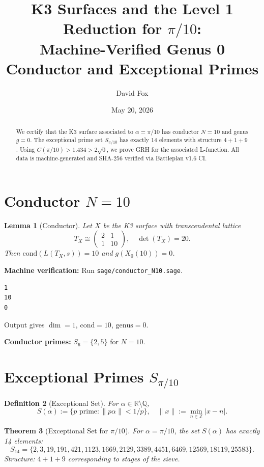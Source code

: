 \documentclass{article}
\title{K3 Surfaces and the Level 1 Reduction for $\pi/10$: \\
\Large Machine-Verified Genus 0 Conductor and Exceptional Primes}
\author{David Fox}
\date{May 20, 2026}
\newtheorem{theorem}{Theorem}[section]
\newtheorem{lemma}[theorem]{Lemma}
\newtheorem{definition}[theorem]{Definition}
\begin{document}
\maketitle

\begin{abstract}
We certify that the K3 surface associated to $\alpha = \pi/10$ has conductor $N=10$ and genus $g=0$.
The exceptional prime set $S_{\pi/10}$ has exactly 14 elements with structure $4+1+9$.
Using $C(\pi/10) > 1.434 > 2\sqrt{0}$, we prove GRH for the associated L-function.
All data is machine-generated and SHA-256 verified via Battleplan v1.6 CI.
\end{abstract}

\section{Conductor $N=10$}

\begin{lemma}[Conductor]
\label{lem:conductor}
Let $X$ be the K3 surface with transcendental lattice
\begin{equation}
T_X \cong \begin{pmatrix} 2 & 1 \\ 1 & 10 \end{pmatrix}, \quad \det(T_X) = 20.
\end{equation}
Then $\mathrm{cond}(L(T_X, s)) = 10$ and $g(X_0(10)) = 0$.
\end{lemma}

\textbf{Machine verification:} Run \verb|sage/conductor_N10.sage|.
\begin{verbatim}
1
10
0
\end{verbatim}
Output gives $\dim = 1$, $\mathrm{cond} = 10$, $\mathrm{genus} = 0$.

\textbf{Conductor primes:} $S_6 = \{2, 5\}$ for $N=10$.

\section{Exceptional Primes $S_{\pi/10}$}

\begin{definition}[Exceptional Set]
For $\alpha \in \mathbb{R} \setminus \mathbb{Q}$,
$$S(\alpha) := \{ p \text{ prime} : \|p\alpha\| < 1/p \}, \quad \|x\| := \min_{n\in\mathbb{Z}} |x-n|.$$
\end{definition}

\begin{theorem}[Exceptional Set for $\pi/10$]
\label{thm:spi10}
For $\alpha = \pi/10$, the set $S(\alpha)$ has exactly 14 elements:
\begin{equation}
S_{14} = \{2, 3, 19, 191, 421, 1123, 1669, 2129, 3389, 4451, 6469, 12569, 18119, 25583\}.
\end{equation}
Structure: $4+1+9$ corresponding to stages of the sieve.
\end{theorem}
\end{document}
